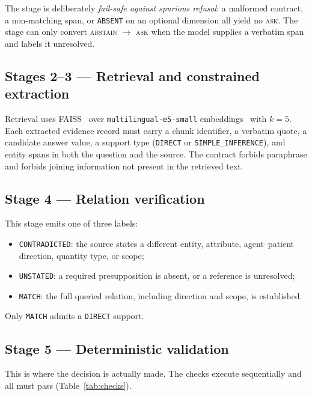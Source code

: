 \documentclass[conference]{IEEEtran}
\newcommand{\ACT}[1]{\textsc{#1}}
\begin{document}
The stage is deliberately \emph{fail-safe against spurious refusal}: a malformed
contract, a non-matching span, or \texttt{ABSENT} on an optional dimension all
yield no \ACT{ask}. The stage can only convert \ACT{abstain} $\rightarrow$
\ACT{ask} when the model supplies a verbatim span and labels it unresolved.

\subsection{Stages 2--3 --- Retrieval and constrained extraction}

Retrieval uses FAISS~\cite{faiss} over \texttt{multilingual-e5-small}
embeddings~\cite{e5} with $k=5$. Each extracted evidence record must carry a chunk
identifier, a verbatim quote, a candidate answer value, a support type
(\texttt{DIRECT} or \texttt{SIMPLE\_INFERENCE}), and entity spans in both the
question and the source. The contract forbids paraphrase and forbids joining
information not present in the retrieved text.

\subsection{Stage 4 --- Relation verification}

This stage emits one of three labels:
\begin{itemize}
  \item \texttt{CONTRADICTED}: the source states a different entity, attribute,
        agent--patient direction, quantity type, or scope;
  \item \texttt{UNSTATED}: a required presupposition is absent, or a reference is
        unresolved;
  \item \texttt{MATCH}: the full queried relation, including direction and scope,
        is established.
\end{itemize}
Only \texttt{MATCH} admits a \texttt{DIRECT} support.

\subsection{Stage 5 --- Deterministic validation}
\label{sec:code-checks}

This is where the decision is actually made. The checks execute sequentially and
all must pass (Table~\ref{tab:checks}).
\end{document}
